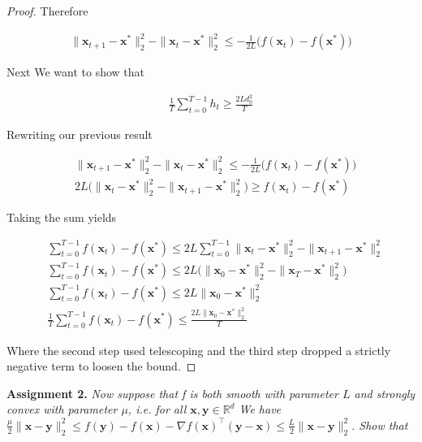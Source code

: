 \documentclass{article}
\begin{document}
\begin{proof}
	Therefore
	
	\begin{align}
		\|\mathbf{x}_{t+1} - \mathbf{x}^*\|^2_2 - \|\mathbf{x}_{t} - \mathbf{x}^*\|^2_2 \le -\frac{1}{2L}  \big(f(\mathbf{x}_t) -  f(\mathbf{x}^*)\big)
	\end{align}
	
	Next We want to show that
	
	\begin{align}
		\frac{1}{T} \sum^{T-1} _{t=0} h_t \ge \frac{2L d_0^2}{T}
	\end{align}
	
	Rewriting our previous result
	
	\begin{align}
		&\|\mathbf{x}_{t+1} - \mathbf{x}^*\|^2_2 - \|\mathbf{x}_{t} - \mathbf{x}^*\|^2_2 \le -\frac{1}{2L}  \big(f(\mathbf{x}_t) -  f(\mathbf{x}^*)\big)\\
		 & 2L\big( \|\mathbf{x}_{t} - \mathbf{x}^*\|^2_2 - \|\mathbf{x}_{t+1} - \mathbf{x}^*\|^2_2\big)  \ge  f(\mathbf{x}_t) -  f(\mathbf{x}^*)
	\end{align}
	
	Taking the sum yields
	
	\begin{align}
		& \sum ^{T-1}_{t=0} f(\mathbf{x}_t) -  f(\mathbf{x}^*) \le 2L \sum^{T-1}_{t=0}  \|\mathbf{x}_{t} - \mathbf{x}^*\|^2_2 - \|\mathbf{x}_{t+1} - \mathbf{x}^*\|^2_2 \\
		& \sum ^{T-1}_{t=0} f(\mathbf{x}_t) -  f(\mathbf{x}^*) \le 2L \big( \|\mathbf{x}_{0} - \mathbf{x}^*\|^2_2 - \|\mathbf{x}_{T} - \mathbf{x}^*\|^2_2\big) \\
		& \sum ^{T-1}_{t=0} f(\mathbf{x}_t) -  f(\mathbf{x}^*) \le 2L \|\mathbf{x}_{0} - \mathbf{x}^*\|^2_2 \\
		& \frac{1}{T}\sum ^{T-1}_{t=0} f(\mathbf{x}_t) -  f(\mathbf{x}^*) \le \frac{2L \|\mathbf{x}_{0} - \mathbf{x}^*\|^2_2}{T}
	\end{align}
	
	Where the second step used telescoping and the third step dropped a strictly negative term to loosen the bound. 
\end{proof}

\textbf{Assignment 2.} \textit{Now suppose that f is both smooth with parameter $L$ and strongly convex with parameter $\mu$, i.e. for all $\mathbf{x, y}\in\mathbb{R}^d$ We have $\frac{\mu}{2}\|\mathbf{x}-\mathbf{y}\|^2_2 \le f(\mathbf{y}) - f(\mathbf{x}) - \nabla f(\mathbf{x})^\top(\mathbf{y-x}) \le \frac{L}{2} \|\mathbf{x-y}\|^2_2$. Show that}
\end{document}
